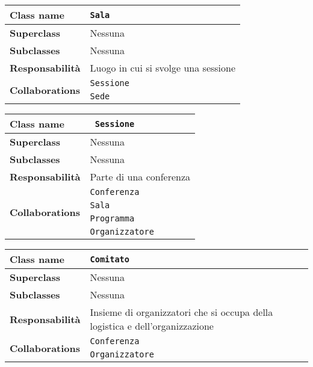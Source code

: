 \begin{table}[h!]
\begin{tabular}{|l|l|}
			\hline
	\textbf{Class name} & \texttt{Sala} \\ \hline
	\textbf{Superclass} & Nessuna \\ \hline
	\textbf{Subclasses} & Nessuna  \\ \hline
	\textbf{Responsabilità} & Luogo in cui si svolge una sessione \\ \hline
	\multirow{2}{*}{\textbf{Collaborations}} & \texttt{Sessione} \\ 
	& \texttt{Sede} \\ \hline
\end{tabular}
\quad
\begin{tabular}{|l|l|}
			\hline
	\textbf{Class name} &\texttt{ Sessione }\\ \hline
	\textbf{Superclass} & Nessuna \\ \hline
	\textbf{Subclasses} & Nessuna  \\ \hline
	\textbf{Responsabilità} & Parte di una conferenza \\ \hline
	\multirow{4}{*}{\textbf{Collaborations}} & \texttt{Conferenza} \\ 
	& \texttt{Sala} \\
	& \texttt{Programma} \\
	& \texttt{Organizzatore} \\ \hline
\end{tabular}
\end{table}

\begin{table}[h!]
\begin{tabular}{|l|l|}
	\hline
	\textbf{Class name} & \texttt{Comitato} \\ \hline
	\textbf{Superclass} & Nessuna \\ \hline
	\textbf{Subclasses} & Nessuna  \\ \hline
	\textbf{Responsabilità} & Insieme di organizzatori che si occupa della logistica e dell'organizzazione \\ \hline
	\multirow{2}{*}{\textbf{Collaborations}} & \texttt{Conferenza} \\ 
	& \texttt{Organizzatore} \\ \hline
\end{tabular}
\end{table}

